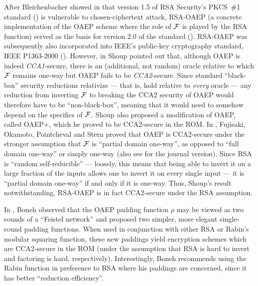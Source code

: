 After Bleichenbacher showed in \cite{bleichenbacher:pkcsbroken} that version
1.5 of RSA Security's PKCS~\#1 standard (\cite{rsa:pkcs15}) is vulnerable to
chosen-ciphertext attack, RSA-OAEP (a concrete implementation of the OAEP
scheme where the role of $\mathcal{F}$ is played by the RSA function) served as the
basis for version 2.0 of the standard (\cite{rsa:pkcs20}). RSA-OAEP was
subsequently also incorporated into IEEE's public-key cryptography standard,
IEEE P1363-2000 (\cite{ieee:p1363}).  However, in \cite{shoup:oaepbad} Shoup
pointed out that, although OAEP is indeed {\it CCA1}-secure, there is an
(additional, not random) oracle relative to which $\mathcal{F}$ remains one-way but
OAEP fails to be {\it CCA2}-secure. Since standard
``black-box'' security reductions relativize --- that is, hold relative to {\it
every} oracle --- any reduction from inverting $\mathcal{F}$ to breaking the CCA2
security of OAEP would therefore have to be ``non-black-box'', meaning that it
would need to somehow depend on the specifics of $\mathcal{F}$. Shoup also proposed a
modification of OAEP, called OAEP+, which he proved to be CCA2-secure in the
ROM. In \cite{fujisaki:rsaoaepok1}, Fujisaki, Okamoto, Pointcheval and Stern
proved that OAEP is CCA2-secure under the stronger assumption that $\mathcal{F}$ is
``partial domain one-way'', as opposed to ``full domain one-way'' or simply
one-way (also see \cite{fujisaki:rsaoaepok2} for the journal version). Since
RSA is ``random self-reducible'' --- loosely, this means that being able to
invert it on a large fraction of the inputs allows one to invert it on every
single input --- it is ``partial domain one-way''  if and only if it is
one-way.  Thus, Shoup's result notwithstanding, RSA-OAEP is in fact
CCA2-secure under the RSA assumption.

In \cite{boneh:simpleoaep}, Boneh observed that the OAEP padding function
$\rho$ may be viewed as two rounds of a ``Feistel network'' and proposed two
simpler, more elegant single-round padding functions. When used in conjunction
with either RSA or Rabin's modular squaring function, these new paddings yield
encryption schemes which are CCA2-secure in the ROM (under the assumption
that RSA is hard to invert and factoring is hard, respectively).
Interestingly, Boneh recommends using the Rabin function in preference to
RSA where his paddings are concerned, since it has better ``reduction
efficiency''.

